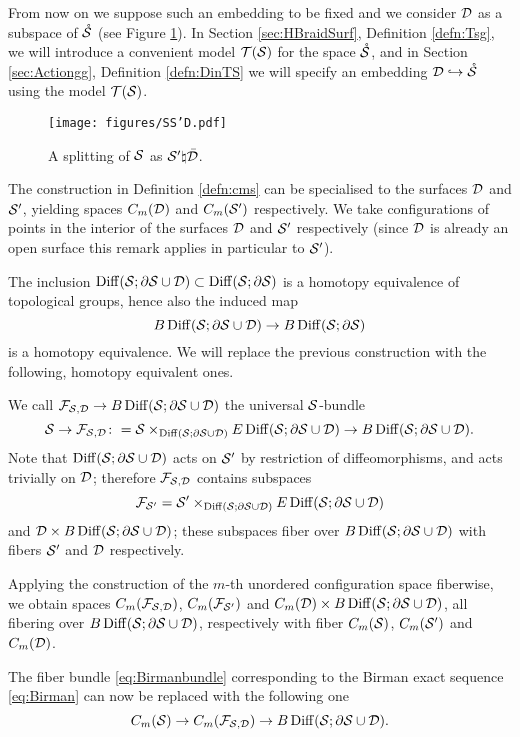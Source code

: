 From now on we suppose such an embedding to be fixed and we consider $\D$ as a subspace
of $\mrS$ (see Figure \ref{fig:SS'D}). In Section \ref{sec:HBraidSurf}, Definition \ref{defn:Tsg},
we will introduce a convenient model $\T(\S)$ for the space $\mrS$, and in Section \ref{sec:Actiongg},
Definition \ref{defn:DinTS}
we will specify an embedding $\D\hookrightarrow\mrS$ using the model $\T(\S)$.

\begin{figure}\centering
 \texttt{[image: figures/SS'D.pdf]}
 \caption{A splitting of $\S$ as $\S'\natural\bar\D$.}
\label{fig:SS'D}
\end{figure}

The construction in Definition \ref{defn:cms} can be specialised to the
surfaces $\D$ and $\S'$, yielding spaces $C_m(\D)$ and $C_m(\S')$ respectively.
We take configurations of points in the interior of the surfaces $\D$ and $\S'$ respectively
(since $\D$ is already an open surface this remark applies in particular to $\S'$).

The inclusion $\Diff(\S;\partial\S\cup\D)\subset\Diff(\S;\partial\S)$ is a homotopy
equivalence of topological groups, hence also the induced map
\[
B\Diff(\S;\partial\S\cup\D)\to B\Diff(\S;\partial\S)
\]
is a homotopy equivalence. We will replace the previous construction with the following,
homotopy equivalent ones.
\begin{defn}
\label{defn:universalSbundle}
We call $\cF_{\S,\D}\to B\Diff(\S;\partial\S\cup\D)$
the universal $\S$-bundle
 \[
  \S\to\cF_{\S,\D}\colon=\S\times_{\Diff(\S;\partial\S\cup\D)}E\Diff(\S;\partial\S\cup\D)\to B\Diff(\S;\partial\S\cup\D).
 \]
Note that $\Diff(\S;\partial\S\cup\D)$ acts on $\S'$ by restriction of diffeomorphisms, and acts trivially
on $\D$; therefore $\cF_{\S,\D}$ contains subspaces
\[
 \cF_{\S'}= \S'\times_{\Diff(\S;\partial\S\cup\D)}E\Diff(\S;\partial\S\cup\D)
\]
and $\D\times B\Diff(\S;\partial\S\cup\D)$; these subspaces fiber over $B\Diff(\S;\partial\S\cup\D)$
with fibers $\S'$ and $\D$ respectively.

Applying the construction of the $m$-th unordered configuration space fiberwise, we obtain spaces
$C_m(\cF_{\S,\D})$, $C_m(\cF_{\S'})$ and $C_m(\D)\times B\Diff(\S;\partial\S\cup\D)$,
all fibering over $B\Diff(\S;\partial\S\cup\D)$, respectively with fiber $\cms$,
$C_m(\S')$ and $C_m(\D)$.
\end{defn}
The fiber bundle \eqref{eq:Birmanbundle} corresponding to the Birman exact sequence \eqref{eq:Birman}
can now be replaced with the following one
\begin{equation}\label{eq:BirmanbundleD}
\cms\to C_m(\cF_{\S,\D})\to B\Diff(\S;\partial\S\cup\D).
\end{equation}

